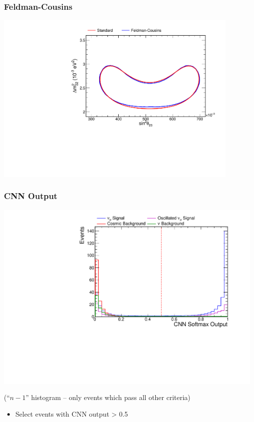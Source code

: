 \documentclass[10pt,professionalfonts,xcolor=table]{beamer}
\begin{document}
\begin{frame}
\frametitle{Feldman-Cousins}
\centering
\includegraphics[angle=-90, width=0.9\textwidth]{figures/results/fc_compare.pdf}
\end{frame}


\begin{frame}

\frametitle{CNN Output}

  \begin{center}
  \includegraphics[height=0.7\textwidth, angle=-90]{figures/selection/n1_cvnnumu.pdf}

  {\footnotesize(``$n-1$'' histogram -- only events which pass all other criteria)}
  \end{center}
  \begin{itemize}
  \item Select events with CNN output > 0.5
  \end{itemize}
\end{frame}
\end{document}
